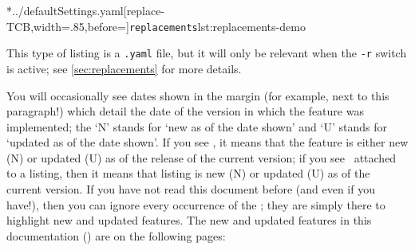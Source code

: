 	\begin{minipage}{.55\textwidth}
		\cmhlistingsfromfile[style=replacements]*{../defaultSettings.yaml}[replace-TCB,width=.85\linewidth,before=\centering]{\texttt{replacements}}{lst:replacements-demo}
	\end{minipage}%
	\hfill
	\begin{minipage}{.4\textwidth}
		This type of listing is a \texttt{.yaml} file, but it will only
		be relevant when the \texttt{-r} switch is active; see \vref{sec:replacements}
		for more details.
	\end{minipage}%

	You will occasionally see dates shown in the margin (for example, next to this
	paragraph!)%
	 which detail
	the date of the version in which the feature was implemented; the `N' stands for `new as
	of the date shown' and `U' stands for `updated as of the date shown'. If you see
	\stardemo, it means that the feature is either new (N) or updated (U) as of the release
	of the current version; if you see \stardemo\, attached to a listing, then it means that
	listing is new (N) or updated (U) as of the current version. If you have not read this
	document before (and even if you have!), then you can ignore every occurrence of the
	\stardemo; they are simply there to highlight new and updated features. The new and
	updated features in this documentation (\gitRel) are on the following pages:
	\listOfNewFeatures %

